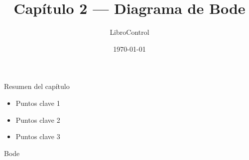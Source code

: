 \documentclass{beamer}
\title{Capítulo 2 — Diagrama de Bode}
\author{LibroControl}
\date{\today}
\begin{document}
\begin{frame}
  \titlepage
\end{frame}

\begin{frame}{Resumen del capítulo}
  \begin{itemize}
    \item Puntos clave 1
    \item Puntos clave 2
    \item Puntos clave 3
  \end{itemize}
\end{frame}

\begin{frame}{Bode}
  \centering
\end{frame}
\end{document}
